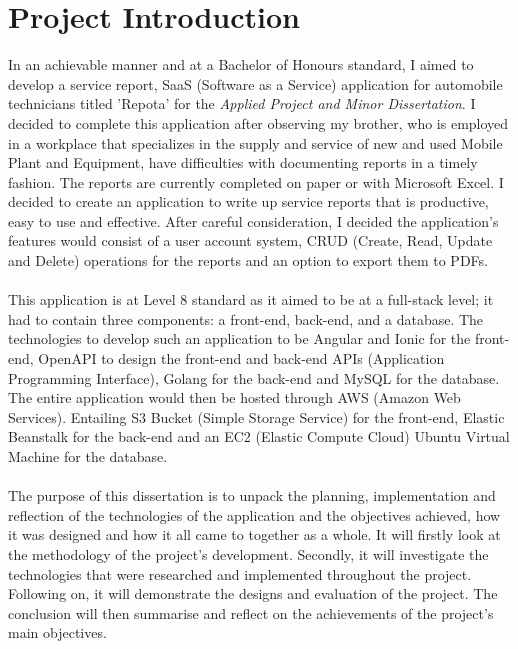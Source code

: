 \section{Project Introduction}
In an achievable manner and at a Bachelor of Honours standard, I aimed to develop a service report, SaaS (Software as a Service) application for automobile technicians titled 'Repota' for the \textit{Applied Project and Minor Dissertation}. I decided to complete this application after observing my brother, who is employed in a workplace that specializes in the supply and service of new and used Mobile Plant and Equipment, have difficulties with documenting reports in a timely fashion. The reports are currently completed on paper or with Microsoft Excel. I decided to create an application to write up service reports that is productive, easy to use and effective. After careful consideration, I decided the application's features would consist of a user account system, CRUD (Create, Read, Update and Delete) operations for the reports and an option to export them to PDFs.
\\\\ This application is at Level 8 standard as it aimed to be at a full-stack level; it had to contain three components: a front-end, back-end, and a database. The technologies to develop such an application to be Angular and Ionic for the front-end, OpenAPI to design the front-end and back-end APIs (Application Programming Interface), Golang for the back-end and MySQL for the database. The entire application would then be hosted through AWS (Amazon Web Services). Entailing S3 Bucket (Simple Storage Service) for the front-end, Elastic Beanstalk for the back-end and an EC2 (Elastic Compute Cloud) Ubuntu Virtual Machine for the database.
\\\\ The purpose of this dissertation is to unpack the planning, implementation and reflection of the technologies of the application and the objectives achieved, how it was designed and how it all came to together as a whole. It will firstly look at the methodology of the project's development. Secondly, it will investigate the technologies that were researched and implemented throughout the project. Following on, it will demonstrate the designs and evaluation of the project. The conclusion will then summarise and reflect on the achievements of the project's main objectives.

